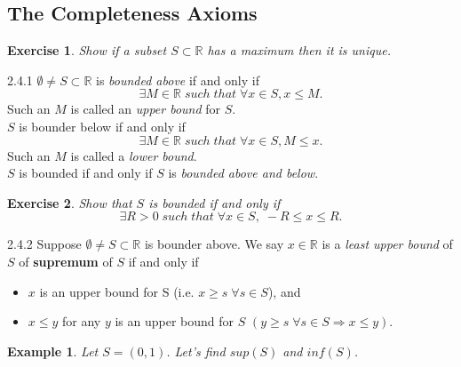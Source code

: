 \documentclass[a4paper]{article}
\def\rr{{\mathbb R}}
\newtheorem{exercise}{Exercise}[subsection]
\newtheorem{example}{Example}[subsection]
\begin{document}
\subsection{The Completeness Axioms}
\begin{exercise}
    Show if a subset $S \subset \rr $ has a maximum then it is unique.  
\end{exercise}
\begin{definition}{2.4.1}{}
    $\emptyset \neq S \subset \mathbb{R}$ is \emph{bounded above} if and only if \\
    \begin{equation*}
     \exists M \in \mathbb{R} \; such \; that\; \forall x \in S, x \leq M.
    \end{equation*}
    Such an $M$ is called an \emph{upper bound} for $S$.\\
    $S$ is bounder below if and only if 
    \begin{equation*} 
        \exists M \in \mathbb{R} \; such \; that \; \forall x\in S,M\leq x.
    \end{equation*}
    Such an $M$ is called a \emph{lower bound}.\\
   $S$ is bounded if and only if $S$ is \emph{bounded above and below}.
\end{definition}
\begin{exercise}
    Show that $S$ is bounded if and only if 
    \begin{equation*}
        \exists R>0 \; such \; that \; \forall x \in S, \; -R\leq x \leq R.
    \end{equation*}
\end{exercise}  
\begin{definition}{2.4.2}{}
    Suppose $\emptyset \neq S \subset \mathbb{R}$ is bounder above. We say $x\in \mathbb{R}$ is a \emph{least upper bound} of $S$ of \textbf{supremum} of $S$ if and only if 
    \begin{itemize}
        \item $x$ is an upper bound for S (i.e. $x\geq s \; \forall s \in S$), and
        \item $x\leq y$ for any $y$ is an upper bound for $S$ $(y\geq s \; \forall s\in S \Longrightarrow   x\leq y)$.
    \end{itemize}
\end{definition}
\begin{example}
    Let $S=(0,1)$. Let's find $sup(S)$ and $inf(S)$.\\
\end{example}
\end{document}
